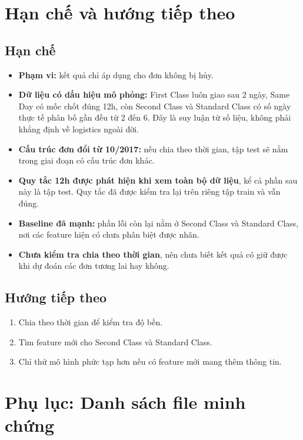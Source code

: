 \documentclass[11pt,a4paper]{article}
\begin{document}
\section{Hạn chế và hướng tiếp theo}

\subsection*{Hạn chế}
\begin{itemize}
  \item \textbf{Phạm vi:} kết quả chỉ áp dụng cho đơn không bị hủy.
  \item \textbf{Dữ liệu có dấu hiệu mô phỏng:} First Class luôn giao sau 2 ngày, Same Day có mốc chốt đúng 12h, còn Second Class và Standard Class có số ngày thực tế phân bố gần đều từ 2 đến 6. Đây là suy luận từ số liệu, không phải khẳng định về logistics ngoài đời.
  \item \textbf{Cấu trúc đơn đổi từ 10/2017:} nếu chia theo thời gian, tập test sẽ nằm trong giai đoạn có cấu trúc đơn khác.
  \item \textbf{Quy tắc 12h được phát hiện khi xem toàn bộ dữ liệu}, kể cả phần sau này là tập test. Quy tắc đã được kiểm tra lại trên riêng tập train và vẫn đúng.
  \item \textbf{Baseline đã mạnh:} phần lỗi còn lại nằm ở Second Class và Standard Class, nơi các feature hiện có chưa phân biệt được nhãn.
  \item \textbf{Chưa kiểm tra chia theo thời gian}, nên chưa biết kết quả có giữ được khi dự đoán các đơn tương lai hay không.
\end{itemize}

\subsection*{Hướng tiếp theo}
\begin{enumerate}
  \item Chia theo thời gian để kiểm tra độ bền.
  \item Tìm feature mới cho Second Class và Standard Class.
  \item Chỉ thử mô hình phức tạp hơn nếu có feature mới mang thêm thông tin.
\end{enumerate}

\section*{Phụ lục: Danh sách file minh chứng}
\end{document}
